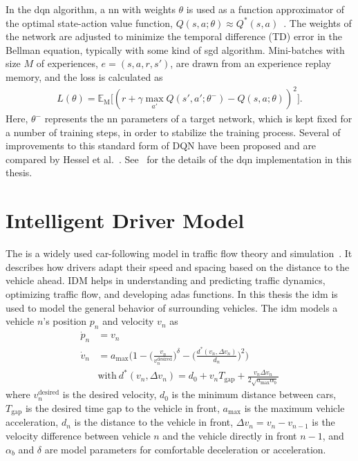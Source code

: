 In the \gls{dqn} algorithm, a \gls{nn} with weights $\theta$ is used as a function approximator of the optimal state-action value function, $Q(s,a;\theta) \approx Q^*(s,a)$~\cite{Mnih2015}. The weights of the network are adjusted to minimize the temporal difference (TD) error in the Bellman equation, typically with some kind of \gls{sgd} algorithm. Mini-batches with size $M$ of experiences, $e=(s,a,r,s')$, are drawn from an experience replay memory, and the loss is calculated as
%
\begin{align}
    L(\theta) = \mathbb{E}_\mathrm{M} \Big[ (r + \gamma \max_{a'} Q(s',a';\theta^-)
    - Q(s,a;\theta) )^2 \Big].
    \label{eq:lossDQN}
\end{align}
%
Here, $\theta^-$ represents the \gls{nn} parameters of a target network, which is kept fixed for a number of training steps, in order to stabilize the training process. 
Several of improvements to this standard form of DQN have been proposed and are compared by Hessel et al.~\cite{Hessel2018}.
See \paperLSTM \ for the details of the \gls{dqn} implementation in this thesis.

\section{Intelligent Driver Model}
\label{ch:idm}
The  is a widely used car-following model in traffic flow theory and simulation~\cite{idm2000}. It describes how drivers adapt their speed and spacing based on the distance to the vehicle ahead. IDM helps in understanding and predicting traffic dynamics, optimizing traffic flow, and developing \gls{adas} functions. In this thesis the \gls{idm} is used to model the general behavior of surrounding vehicles.
The \gls{idm} models a vehicle $n$'s position $p_n$ and velocity $v_n$ as
\begin{align}
    \dot p_n & = v_n\\
    \dot v_n & = a_{\mathrm{max}}\Big(1-\Big(\frac{v_n}{v^\mathrm{desired}_n}\Big)^\delta-\Big( \frac{d^*(v_n,\Delta v_n)}{d_n}\Big)^2\Big) \label{eq:idm} \\
    & \mathrm{with ~} d^*(v_n, \Delta v_n) = d_0 + v_n T_{\mathrm{gap}} + \frac{v_n \Delta v_n}{2 \sqrt{a_{\mathrm{max}} \alpha_b}} \nonumber
\end{align}
where $v^\mathrm{desired}_n$ is the desired velocity, $d_0$ is the minimum distance between cars, $T_{\mathrm{gap}}$ is the desired time gap to the vehicle in front, $a_\mathrm{max}$ is the maximum vehicle acceleration, $d_n$ is the distance to the vehicle in front, $\Delta v_n = v_n - v_{n-1}$ is the velocity difference between vehicle $n$ and the vehicle directly in front $n-1$, and $\alpha_b$ and $\delta$ are model parameters for comfortable deceleration or acceleration.

